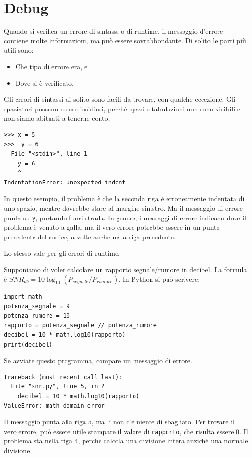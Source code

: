 \documentclass[10pt]{book}
\begin{document}
\section{Debug}
\label{whitespace}

Quando si verifica un errore di sintassi o di runtime, il messaggio d'errore  contiene molte informazioni, ma può essere sovrabbondante. Di solito le parti più utili sono:

\begin{itemize}

\item Che tipo di errore era, e

\item Dove si è verificato.

\end{itemize}

Gli errori di sintassi di solito sono facili da trovare, con qualche eccezione. Gli spaziatori possono essere insidiosi, perché spazi e tabulazioni non sono visibili e non siamo abituati a tenerne conto.

\begin{verbatim}
>>> x = 5
>>>  y = 6
  File "<stdin>", line 1
    y = 6
    ^
IndentationError: unexpected indent
\end{verbatim}
%
In questo esempio, il problema è che la seconda riga è erroneamente indentata di uno spazio, mentre dovrebbe stare al margine sinistro. Ma il messaggio di errore punta su {\tt y}, portando fuori strada. In genere, i messaggi di errore indicano dove il problema è venuto a galla, ma il vero errore potrebbe essere in un punto precedente del codice, a volte anche nella riga precedente.


Lo stesso vale per gli errori di runtime. 

Supponiamo di voler calcolare un rapporto segnale/rumore in decibel. La formula è
 $SNR_{db} = 10 \log_{10} (P_{segnale} / P_{rumore})$. In Python si può scrivere:

\begin{verbatim}
import math
potenza_segnale = 9
potenza_rumore = 10
rapporto = potenza_segnale // potenza_rumore
decibel = 10 * math.log10(rapporto)
print(decibel)
\end{verbatim}
%
Se avviate questo programma, compare un messaggio di errore.

\begin{verbatim}
Traceback (most recent call last):
  File "snr.py", line 5, in ?
    decibel = 10 * math.log10(rapporto)
ValueError: math domain error
\end{verbatim}
%
Il messaggio punta alla riga 5, ma lì non c'è niente di sbagliato. Per trovare il vero errore, può essere utile stampare il valore di {\tt rapporto}, che risulta essere 0. Il problema sta nella riga 4, perché calcola una divisione intera anziché una normale divisione.
\end{document}
